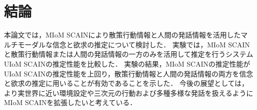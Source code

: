 \chapter{結論}
本論文では，MIoM SCAINにより散策行動情報と人間の発話情報を活用したマルチモーダルな信念と欲求の推定について検討した．
実験では，MIoM SCAINと散策行動情報または人間の発話情報の一方のみを活用して推定を行うシステムUIoM SCAINの推定性能を比較した．
実験の結果，MIoM SCAINの推定性能がUIoM SCAINの推定性能を上回り，散策行動情報と人間の発話情報の両方を信念と欲求の推定に用いることが有効であることを示した．
今後の展望としては，より実世界に近い環境設定や三次元の行動および多種多様な発話を扱えるようにMIoM SCAINを拡張したいと考えている．
